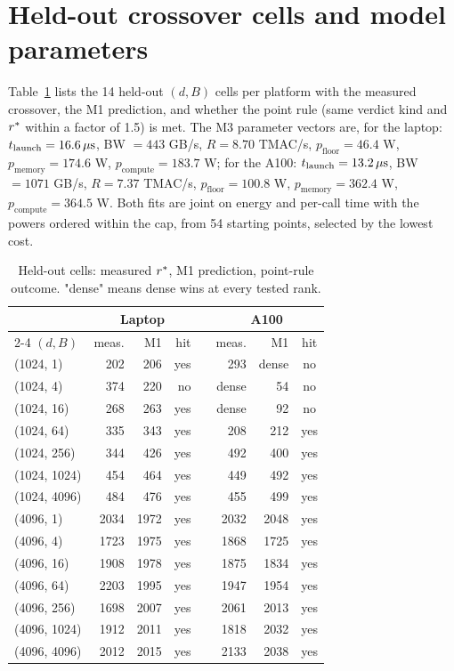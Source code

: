\section{Held-out crossover cells and model parameters}
\label{app:tables}

Table~\ref{tab:cells} lists the 14 held-out $(d, B)$ cells per platform with the measured crossover, the M1 prediction, and whether the point rule (same verdict kind and $r^{*}$ within a factor of 1.5) is met. The M3 parameter vectors are, for the laptop: $t_{\mathrm{launch}} = 16.6\,\mu\mathrm{s}$, BW $= 443$ GB/s, $R = 8.70$ TMAC/s, $p_{\mathrm{floor}} = 46.4$ W, $p_{\mathrm{memory}} = 174.6$ W, $p_{\mathrm{compute}} = 183.7$ W; for the A100: $t_{\mathrm{launch}} = 13.2\,\mu\mathrm{s}$, BW $= 1071$ GB/s, $R = 7.37$ TMAC/s, $p_{\mathrm{floor}} = 100.8$ W, $p_{\mathrm{memory}} = 362.4$ W, $p_{\mathrm{compute}} = 364.5$ W. Both fits are joint on energy and per-call time with the powers ordered within the cap, from 54 starting points, selected by the lowest cost.

\begin{table}[h]
\caption{Held-out cells: measured $r^{*}$, M1 prediction, point-rule outcome. "dense" means dense wins at every tested rank.}
\label{tab:cells}
\vskip 0.1in
\centering
\footnotesize
\setlength{\tabcolsep}{4pt}
\begin{tabular}{@{}lrrrcrrc@{}}
\toprule
 & \multicolumn{3}{c}{Laptop} & & \multicolumn{3}{c}{A100} \\
\cmidrule{2-4} \cmidrule{6-8}
$(d, B)$ & meas. & M1 & hit & & meas. & M1 & hit \\
\midrule
(1024, 1) & 202 & 206 & yes & & 293 & dense & no \\
(1024, 4) & 374 & 220 & no & & dense & 54 & no \\
(1024, 16) & 268 & 263 & yes & & dense & 92 & no \\
(1024, 64) & 335 & 343 & yes & & 208 & 212 & yes \\
(1024, 256) & 344 & 426 & yes & & 492 & 400 & yes \\
(1024, 1024) & 454 & 464 & yes & & 449 & 492 & yes \\
(1024, 4096) & 484 & 476 & yes & & 455 & 499 & yes \\
(4096, 1) & 2034 & 1972 & yes & & 2032 & 2048 & yes \\
(4096, 4) & 1723 & 1975 & yes & & 1868 & 1725 & yes \\
(4096, 16) & 1908 & 1978 & yes & & 1875 & 1834 & yes \\
(4096, 64) & 2203 & 1995 & yes & & 1947 & 1954 & yes \\
(4096, 256) & 1698 & 2007 & yes & & 2061 & 2013 & yes \\
(4096, 1024) & 1912 & 2011 & yes & & 1818 & 2032 & yes \\
(4096, 4096) & 2012 & 2015 & yes & & 2133 & 2038 & yes \\
\bottomrule
\end{tabular}
\end{table}

